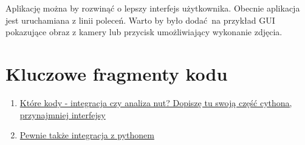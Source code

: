 \documentclass[12pt]{article}
\begin{document}
Aplikację można by rozwinąć o lepszy interfejs użytkownika. Obecnie aplikacja jest uruchamiana z linii poleceń. Warto by było dodać na przykład GUI pokazujące obraz z kamery lub przycisk umożliwiający wykonanie zdjęcia.

\section{Kluczowe fragmenty kodu}
\begin{enumerate}
	\item \underline{Które kody - integracja czy analiza nut? Dopiszę tu swoją część cythona, przynajmniej interfejsy}
	\item \underline{Pewnie także integracja z pythonem}
\end{enumerate}

\clearpage
\end{document}
